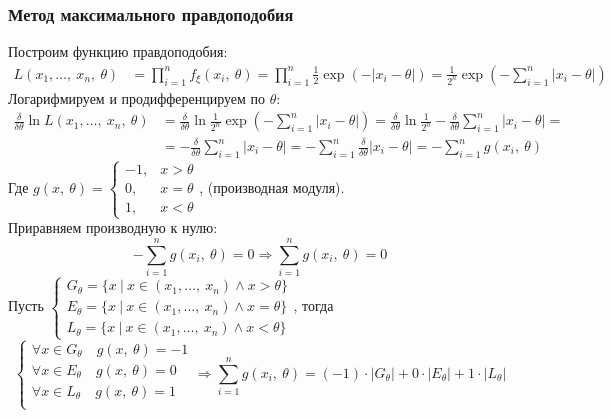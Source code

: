 \documentclass[12pt, a4paper]{article}
\begin{document}
\subsubsection*{Метод максимального правдоподобия}
Построим функцию правдоподобия:
\begin{equation*}
    \begin{aligned}
        L(x_1,\dots,\ x_n,\ \theta) &= \prod_{i = 1}^{n} f_{\xi}(x_i,\ \theta) = \prod_{i = 1}^{n} \frac{1}{2} \exp\left(-|x_i - \theta|\right) = \frac{1}{2^n} \exp\left(-\sum_{i = 1}^{n}|x_i - \theta|\right)
    \end{aligned}
\end{equation*}
Логарифмируем и продифференцируем по $\theta$:
\begin{equation*}
    \begin{aligned}
        \frac{\delta}{\delta \theta} \ln L(x_1,\dots,\ x_n,\ \theta) &= \frac{\delta}{\delta \theta} \ln \frac{1}{2^n} \exp\left(-\sum_{i = 1}^{n}|x_i - \theta|\right) = \frac{\delta}{\delta \theta} \ln \frac{1}{2^n} - \frac{\delta}{\delta \theta} \sum_{i = 1}^{n}|x_i - \theta| = \\
        &= -\frac{\delta}{\delta \theta} \sum_{i = 1}^{n}|x_i -\theta| = -\sum_{i = 1}^{n} \frac{\delta}{\delta \theta} |x_i - \theta| = -\sum_{i = 1}^{n} g(x_i,\ \theta)
    \end{aligned}
\end{equation*}
Где $g(x,\ \theta) = \begin{cases}
    -1, & x > \theta\\
    0, & x = \theta\\
    1, & x < \theta
\end{cases}$, (производная модуля).\\
Приравняем производную к нулю:
\begin{equation*}
    -\sum_{i = 1}^{n} g(x_i,\ \theta) = 0\Rightarrow \sum_{i = 1}^{n} g(x_i,\ \theta) = 0
\end{equation*}
Пусть $\begin{cases}

    G_{\theta} = \{x\ |\ x\in (x_1,\dots,\ x_n) \wedge x > \theta\}\\
    E_{\theta} = \{x\ |\ x\in (x_1,\dots,\ x_n) \wedge x = \theta\}\\
    L_{\theta} = \{x\ |\ x\in (x_1,\dots,\ x_n) \wedge x < \theta\}
\end{cases}$, тогда
\[\begin{cases}
    \forall x\in G_{\theta}\quad g(x,\ \theta) = -1\\
    \forall x\in E_{\theta}\quad g(x,\ \theta) = 0\\
    \forall x\in L_{\theta}\quad g(x,\ \theta) = 1\\
\end{cases}\Rightarrow \sum_{i = 1}^{n} g(x_i,\ \theta) = (-1)\cdot|G_{\theta}| + 0\cdot|E_{\theta}| + 1\cdot |L_{\theta}|\]
\end{document}

